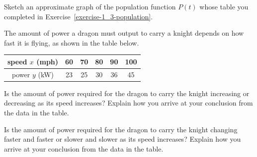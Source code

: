 \begin{exercise}
Sketch an approximate graph of the population function $P(t)$ whose table you completed in Exercise~\ref{exercise-1_3-population}.
\end{exercise}

\begin{solution}

\begin{center}
\end{center}
\end{solution}




\begin{exercise}\label{exercise-1_3-dragon}
The amount of power a dragon must output to carry a knight depends on how fast it is flying, as shown in the table below.
\begin{center}
\begin{tabular}{|c|c|c|c|c|c|}
\hline speed $x$ (mph) & 60 & 70 & 80 & 90 & 100
\\\hline power $y$ (kW) & 23 & 25 & 30 & 36 &45
\\\hline
\end{tabular}
\end{center}

\begin{parts}
    \item Is the amount of power required for the dragon to carry the knight increasing or decreasing as its speed increases? Explain how you arrive at your conclusion from the data in the table.
    \item Is the amount of power required for the dragon to carry the knight changing faster and faster or slower and slower as its speed increases? Explain how you arrive at your conclusion from the data in the table.
\end{parts}
\end{exercise}


